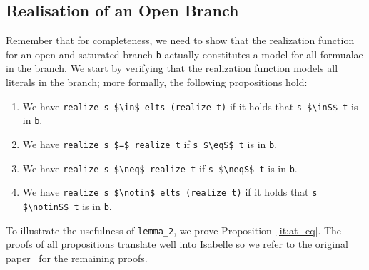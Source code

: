 \documentclass[sigplan,10pt,anonymous,review]{acmart}
\newcommand{\inS}{\in_\text{s}}
\newcommand{\notinS}{\notin_\text{s}}
\newcommand{\eqS}{=_\text{s}}
\newcommand{\neqS}{\neq_\text{s}}
\begin{document}
\subsection{Realisation of an Open Branch}
Remember that for completeness, we need to show that the realization function for an open and saturated branch \lstinline!b! actually constitutes a model for all formualae in the branch.
We start by verifying that the realization function models all literals in the branch; more formally, the following propositions hold: 
\begin{enumerate}[label=(\roman*)]
  \item\label{it:at_mem} We have \lstinline!realize s $\in$ elts (realize t)! if it holds that \lstinline!s $\inS$ t! is in \lstinline!b!. 
  \item\label{it:at_eq} We have \lstinline!realize s $=$ realize t! if \lstinline!s $\eqS$ t! is in \lstinline!b!.
  \item\label{it:af_eq} We have \lstinline!realize s $\neq$ realize t! if \lstinline!s $\neqS$ t! is in \lstinline!b!.
  \item\label{it:af_mem} We have \lstinline!realize s $\notin$ elts (realize t)! if it holds that \lstinline!s $\notinS$ t! is in \lstinline!b!. 
\end{enumerate}
To illustrate the usefulness of \lstinline!lemma_2!, we prove Proposition~\ref{it:at_eq}.
The proofs of all propositions translate well into Isabelle so we refer to the original paper~\cite{new_fast_tableau} for the remaining proofs. 
\end{document}
